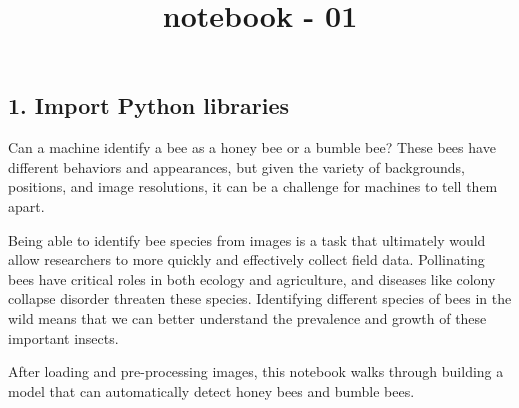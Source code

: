 \documentclass[11pt]{article}
\title{notebook - 01}
\begin{document}
    
    
    \maketitle
    
    

    
    \subsection{1. Import Python libraries}\label{import-python-libraries}

Can a machine identify a bee as a honey bee or a bumble bee? These bees
have different behaviors and appearances, but given the variety of
backgrounds, positions, and image resolutions, it can be a challenge for
machines to tell them apart.

Being able to identify bee species from images is a task that ultimately
would allow researchers to more quickly and effectively collect field
data. Pollinating bees have critical roles in both ecology and
agriculture, and diseases like colony collapse disorder threaten these
species. Identifying different species of bees in the wild means that we
can better understand the prevalence and growth of these important
insects.

After loading and pre-processing images, this notebook walks through
building a model that can automatically detect honey bees and bumble
bees.
\end{document}
